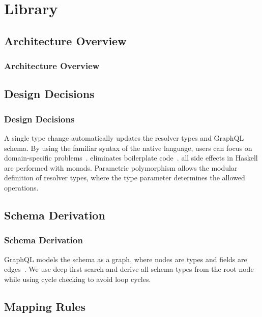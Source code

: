 \section{Library}


\subsection{Architecture Overview}

\begin{frame}\frametitle{Architecture Overview}


\end{frame}

\subsection{Design Decisions} 
\begin{frame}\frametitle{Design Decisions}

\begin{itemize}
     A single type change automatically updates the resolver types and GraphQL schema. 
     By using the familiar syntax of the native language, users can focus on domain-specific problems~\cite{edsl-modeling}.
     eliminates boilerplate code~\cite{scrap-your-boilerplate}.
     all side effects in Haskell are performed with monads. 
     Parametric polymorphism allows the modular definition of resolver types, where the type parameter determines the allowed operations.
\end{itemize}
\end{frame}

\subsection{Schema Derivation} 
\begin{frame}\frametitle{Schema Derivation}

GraphQL models the schema as a graph, where nodes are types and fields are edges~\cite{migrating-to-gql}. We use deep-first search and derive all schema types from the root node while using cycle checking to avoid loop cycles.

\end{frame}

\subsection{Mapping Rules}

